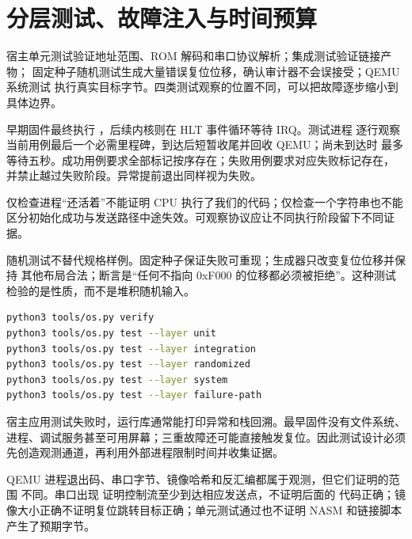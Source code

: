 \section{分层测试、故障注入与时间预算}

宿主单元测试验证地址范围、ROM 解码和串口协议解析；集成测试验证链接产物；
固定种子随机测试生成大量错误复位位移，确认审计器不会误接受；QEMU 系统测试
执行真实目标字节。四类测试观察的位置不同，可以把故障逐步缩小到具体边界。

早期固件最终执行 ，后续内核则在 HLT 事件循环等待 IRQ。测试进程
逐行观察当前用例最后一个必需里程碑，到达后短暂收尾并回收 QEMU；尚未到达时
最多等待五秒。成功用例要求全部标记按序存在；失败用例要求对应失败标记存在，
并禁止越过失败阶段。异常提前退出同样视为失败。

\begin{failurebox}
仅检查进程“还活着”不能证明 CPU 执行了我们的代码；仅检查一个字符串也不能
区分初始化成功与发送路径中途失效。可观察协议应让不同执行阶段留下不同证据。
\end{failurebox}

随机测试不替代规格样例。固定种子保证失败可重现；生成器只改变复位位移并保持
其他布局合法；断言是“任何不指向 0xF000 的位移都必须被拒绝”。这种测试
检验的是性质，而不是堆积随机输入。

\par
\begin{lstlisting}[language=bash]
python3 tools/os.py verify
python3 tools/os.py test --layer unit
python3 tools/os.py test --layer integration
python3 tools/os.py test --layer randomized
python3 tools/os.py test --layer system
python3 tools/os.py test --layer failure-path
\end{lstlisting}

宿主应用测试失败时，运行库通常能打印异常和栈回溯。最早固件没有文件系统、
进程、调试服务甚至可用屏幕；三重故障还可能直接触发复位。因此测试设计必须
先创造观测通道，再利用外部进程限制时间并收集证据。

QEMU 进程退出码、串口字节、镜像哈希和反汇编都属于观测，但它们证明的范围
不同。串口出现  证明控制流至少到达相应发送点，不证明后面的
代码正确；镜像大小正确不证明复位跳转目标正确；单元测试通过也不证明 NASM
和链接脚本产生了预期字节。

